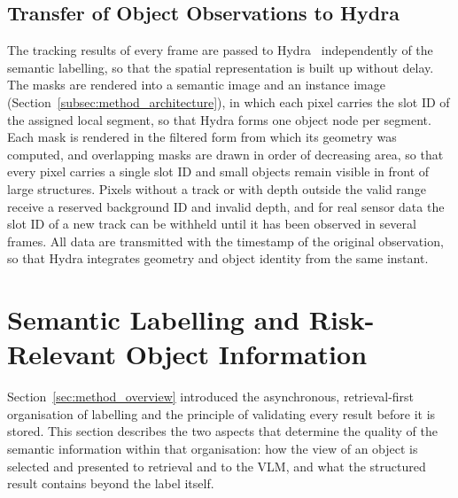 \subsection{Transfer of Object Observations to Hydra}
\label{subsec:method_hydra_input}
{\small
The tracking results of every frame are passed to Hydra~\cite{hughes2022hydra} independently of the semantic labelling, so that the spatial representation is built up without delay. The masks are rendered into a semantic image and an instance image (Section~\ref{subsec:method_architecture}), in which each pixel carries the slot ID of the assigned local segment, so that Hydra forms one object node per segment. Each mask is rendered in the filtered form from which its geometry was computed, and overlapping masks are drawn in order of decreasing area, so that every pixel carries a single slot ID and small objects remain visible in front of large structures. Pixels without a track or with depth outside the valid range receive a reserved background ID and invalid depth, and for real sensor data the slot ID of a new track can be withheld until it has been observed in several frames. All data are transmitted with the timestamp of the original observation, so that Hydra integrates geometry and object identity from the same instant.
\par}
























\section{Semantic Labelling and Risk-Relevant Object Information}
\label{sec:method_labelling}

{\small

Section~\ref{sec:method_overview} introduced the asynchronous, retrieval-first organisation of labelling and the principle of validating every result before it is stored. This section describes the two aspects that determine the quality of the semantic information within that organisation: how the view of an object is selected and presented to retrieval and to the VLM, and what the structured result contains beyond the label itself.

}

